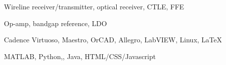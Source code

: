 \documentclass[11pt]{article}
\begin{document}

      {Wireline receiver/transmitter, optical receiver, CTLE, FFE}

      {Op-amp, bandgap reference, LDO}

      {Cadence Virtuoso, Maestro, OrCAD, Allegro, LabVIEW, Linux, \LaTeX}

      {MATLAB, Python,\CPP, Java, HTML/CSS/Javascript} 

\bigskip










\end{document}
